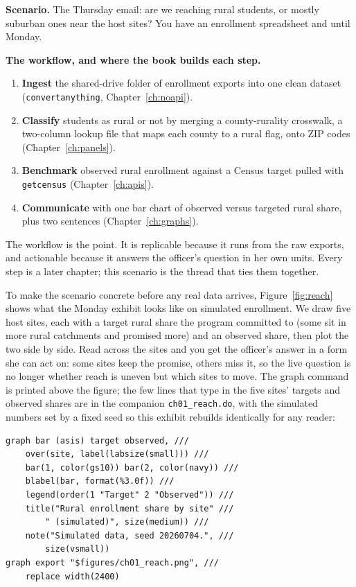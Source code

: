 \documentclass[
    a4paper,
    fontsize=10pt,
    twoside=true,
    numbers=noenddot,
]{kaobook}
\newcounter{appliedexample}
\newenvironment{appliedexample}[1][]{%
    \refstepcounter{appliedexample}%
    \begin{appliedexamplebox}[frametitle={Applied Example~\theappliedexample.~~#1}]%
}{%
    \end{appliedexamplebox}%
}
\begin{document}
\begin{appliedexample}[From a funder's question to a one-page answer]\label{ae:ch01-funder}
\textbf{Scenario.} The Thursday email: are we reaching rural students, or mostly suburban ones near the host sites? You have an enrollment spreadsheet and until Monday.

\medskip
\textbf{The workflow, and where the book builds each step.}
\begin{enumerate}
    \item \textbf{Ingest} the shared-drive folder of enrollment exports into one clean dataset (\texttt{convertanything}, Chapter~\ref{ch:noapi}).
    \item \textbf{Classify} students as rural or not by merging a county-rurality crosswalk, a two-column lookup file that maps each county to a rural flag, onto ZIP codes (Chapter~\ref{ch:panels}).
    \item \textbf{Benchmark} observed rural enrollment against a Census target pulled with \texttt{getcensus} (Chapter~\ref{ch:apis}).
    \item \textbf{Communicate} with one bar chart of observed versus targeted rural share, plus two sentences (Chapter~\ref{ch:graphs}).
\end{enumerate}
The workflow is the point. It is replicable because it runs from the raw exports, and actionable because it answers the officer's question in her own units. Every step is a later chapter; this scenario is the thread that ties them together.
\end{appliedexample}

To make the scenario concrete before any real data arrives, Figure~\ref{fig:reach} shows what the Monday exhibit looks like on simulated enrollment. We draw five host sites, each with a target rural share the program committed to (some sit in more rural catchments and promised more) and an observed share, then plot the two side by side. Read across the sites and you get the officer's answer in a form she can act on: some sites keep the promise, others miss it, so the live question is no longer whether reach is uneven but which sites to move. The graph command is printed above the figure; the few lines that type in the five sites' targets and observed shares are in the companion \texttt{ch01\_reach.do}, with the simulated numbers set by a fixed seed so this exhibit rebuilds identically for any reader:
\par
{\footnotesize
\begin{verbatim}
graph bar (asis) target observed, ///
    over(site, label(labsize(small))) ///
    bar(1, color(gs10)) bar(2, color(navy)) ///
    blabel(bar, format(%3.0f)) ///
    legend(order(1 "Target" 2 "Observed")) ///
    title("Rural enrollment share by site" ///
        " (simulated)", size(medium)) ///
    note("Simulated data, seed 20260704.", ///
        size(vsmall))
graph export "$figures/ch01_reach.png", ///
    replace width(2400)
\end{verbatim}
}
\end{document}
